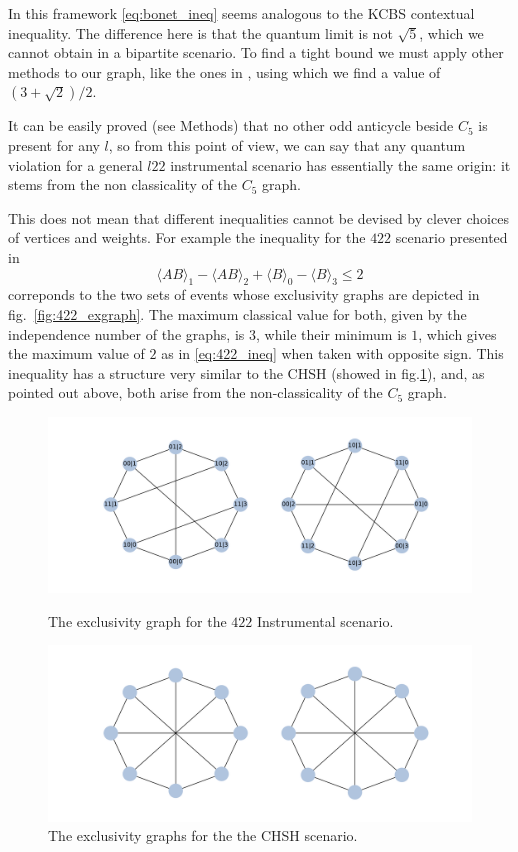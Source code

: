 \documentclass[
    nofootinbin,
    floatfix,
    amsfonts,
    twocolumn, 
    aps, 
    prl]{revtex4-1}
\newcommand{\avg}[1]{\langle#1\rangle}
\begin{document}
In this framework \eqref{eq:bonet_ineq} seems analogous to the KCBS contextual
inequality. %
The difference here is that the quantum limit is not $\sqrt{5}$, which we cannot
obtain in a bipartite scenario.
To find a tight bound we must apply other methods to our graph, like the ones in
\cite{rabelo2014}, using which we find a value of $(3+\sqrt{2})/2$.

It can be easily proved (see Methods) that no other odd anticycle beside
$C_5$ is present for any $l$, so from this point of view, we can say that any
quantum violation for a general $l22$ instrumental scenario has essentially the
same origin: it stems from the non classicality of the $C_5$ graph.

This does not mean that different inequalities cannot be devised by clever
choices of vertices and weights.
For example the inequality for the $422$ scenario presented in
\cite{rand_internal_report}
\begin{equation}
    \avg{AB}_1 -  \avg{AB}_2 + \avg{B}_0 - \avg{B}_3 \le 2
    \label{eq:422_ineq}
\end{equation}
correponds to the two sets of events whose
exclusivity graphs are depicted in fig.~\ref{fig:422_exgraph}.
The maximum classical value for both, given by the independence number of the
graphs, is $3$, while their minimum is $1$, which gives the maximum value of $2$
as in \eqref{eq:422_ineq} when taken with opposite sign.
This inequality has a structure very similar to the CHSH (showed in
fig.\ref{fig:chsh_exgraph}), and, as pointed out above, both arise from the
non-classicality of the $C_5$ graph.

\begin{figure}[b]
    \centering
    \parbox{.9\columnwidth}{
        \includegraphics[width=\columnwidth]{images/422_exgraph.pdf}
        \caption{The exclusivity graph for the $422$ Instrumental scenario.}
        \label{fig:422_exgraph}
    }

    \bigskip
    \parbox{.9\columnwidth}{
        \includegraphics[width=.8\columnwidth]{images/chsh_exgraph.pdf}
        \caption{The exclusivity graphs for the the CHSH scenario.}
        \label{fig:chsh_exgraph}
    }
\end{figure}
\end{document}
